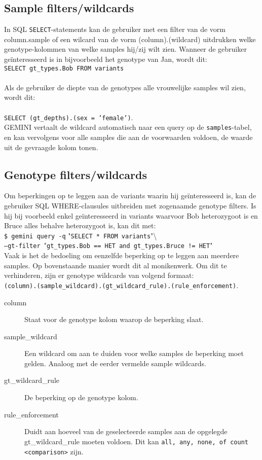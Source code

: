 \subsection{Sample filters/wildcards} 
In SQL \texttt{SELECT}-statements kan de gebruiker met een filter van de vorm column.sample of een wilcard van de vorm (column).(wildcard) uitdrukken welke genotype-kolommen van welke samples hij/zij wilt zien. Wanneer de gebruiker ge\"interesseerd is in bijvoorbeeld het genotype van Jan, wordt dit:\\
\texttt{SELECT gt\_types.Bob FROM variants}\\\\
Als de gebruiker de diepte van de genotypes alle vrouwelijke samples wil zien, wordt dit:\\\\
\texttt{SELECT (gt\_depths).(sex = 'female')}.\\
GEMINI vertaalt de wildcard automatisch naar een query op de \texttt{samples}-tabel, en kan vervolgens voor alle samples die aan de voorwaarden voldoen, de waarde uit de gevraagde kolom tonen.

\subsection{Genotype filters/wildcards}
Om beperkingen op te leggen aan de variants waarin hij ge\"interesseerd is, kan de gebruiker SQL WHERE-clausules uitbreiden met zogenaamde genotype filters. Is hij bij voorbeeld enkel ge\"interesseerd in variants waarvoor Bob heterozygoot is en Bruce alles behalve heterozygoot is, kan dit met:\\

\noindent\texttt{\$ gemini query -q} "\texttt{SELECT * FROM variants}"\textbackslash \\\texttt{--gt-filter }"\texttt{gt\_types.Bob == HET and gt\_types.Bruce != HET}"\\

\noindent Vaak is het de bedoeling om eenzelfde beperking op te leggen aan meerdere samples. Op bovenstaande manier wordt dit al monikenwerk. Om dit te verhinderen, zijn er genotype wildcards van volgend formaat:\\ 
\texttt{(column).(sample\_wildcard).(gt\_wildcard\_rule).(rule\_enforcement)}.
\begin{description}
\item[column] Staat voor de genotype kolom waarop de beperking slaat.
\item[sample\_wildcard] Een wildcard om aan te duiden voor welke samples de beperking moet gelden. Analoog met de eerder vermelde sample wildcards.
\item[gt\_wildcard\_rule] De beperking op de genotype kolom.
\item[rule\_enforcement] Duidt aan hoeveel van de geselecteerde samples aan de opgelegde gt\_wildcard\_rule moeten voldoen. Dit kan \texttt{all, any, none, of count <comparison>} zijn.
\end{description}

